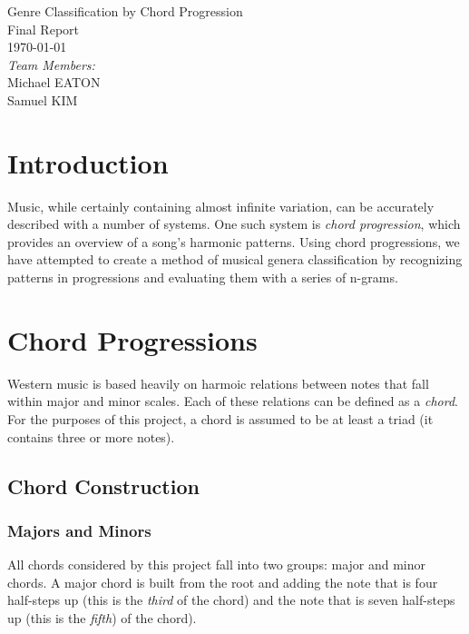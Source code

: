 \documentclass{article}
\begin{document}
\fancyhf{}
\rhead{\today}

\begin{titlepage}
\begin{center}
{\huge Genre Classification by Chord Progression}\\[2cm]
{\Large Final Report}\\[2cm]
{\large \today}\\[2cm]
\emph{Team Members:}\\
Michael \uppercase{Eaton}\\
Samuel \uppercase{Kim}\\
\end{center}
\end{titlepage}

\tableofcontents
\newpage

\section{Introduction}
Music, while certainly containing almost infinite variation, can be accurately described with a number of systems.  One such system is \emph{chord progression}, which provides an overview of a song's harmonic patterns.  Using chord progressions, we have attempted to create a method of musical genera classification by recognizing patterns in progressions and evaluating them with a series of n-grams.

\newpage

\section{Chord Progressions}
Western music is based heavily on harmoic relations between notes 
that fall within major and minor scales. Each of these relations can be 
defined as a \emph{chord}.  For the purposes of this project, a chord 
is assumed to be at least a triad (it contains three or more notes).

	\subsection{Chord Construction}
	
		\subsubsection{Majors and Minors}
		All chords considered by this project fall into two groups:  major 
		and minor chords.  A major chord is built from the root and adding 
		the note that is four half-steps up (this is the \emph{third} of the 
		chord) and the note that is seven half-steps up (this is the \emph{fifth}) 
		of the chord).
\end{document}
